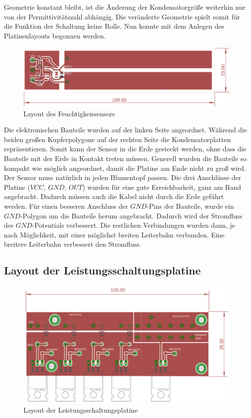 Geometrie konstant bleibt, ist die Änderung der Kondensatorgröße weiterhin nur von der
Permittivitätszahl abhängig. Die veränderte Geometrie spielt somit für die Funktion der
Schaltung keine Rolle. Nun konnte mit dem Anlegen des Platinenlayouts begonnen werden.
\begin{figure}[h]
    \includegraphics[width=\textwidth]{dennis/layout2}
    \caption{Layout des Feuchtigkeissensors}
\end{figure}
Die elektronischen Bauteile wurden auf der linken Seite angeordnet. Während die beiden
großen Kupferpolygone auf der rechten Seite die Kondensatorplatten repräsentieren. Somit
kann der Sensor in die Erde gesteckt werden, ohne dass die Bauteile mit der Erde in Kontakt
treten müssen. Generell wurden die Bauteile so kompakt wie möglich angeordnet, damit die
Platine am Ende nicht zu groß wird. Der Sensor muss natürlich in jeden Blumentopf passen.
Die drei Anschlüsse der Platine ($VCC$, $GND$, $OUT$) wurden für eine gute Erreichbarkeit, ganz
am Rand angebracht. Dadurch müssen auch die Kabel nicht durch die Erde geführt werden.
Für einen besseren Anschluss der $GND$-Pins der Bauteile, wurde ein $GND$-Polygon um die
Bauteile herum angebracht. Dadurch wird der Stromfluss des $GND$-Potentials verbessert. Die
restlichen Verbindungen wurden dann, je nach Möglichkeit, mit einer möglichst breiten
Leiterbahn verbunden. Eine breitere Leiterbahn verbessert den Stromfluss.

\subsection{Layout der Leistungsschaltungsplatine}
\begin{figure}[h]
    \centering
    \includegraphics[width=\textwidth]{dennis/layout1}
    \caption{Layout der Leistungsschaltungsplatine}
\end{figure}

